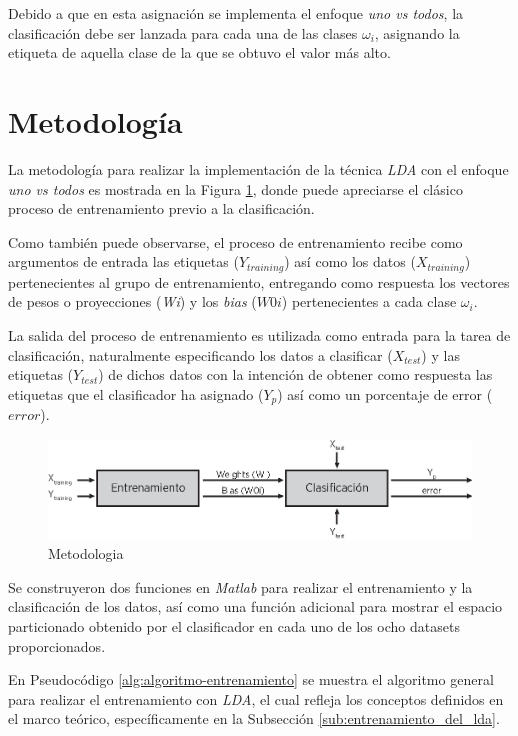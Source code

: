 \documentclass[journal]{IEEEtran}
\begin{document}
Debido a que en esta asignación se implementa el enfoque \emph{uno vs todos}, la clasificación debe ser lanzada para cada una de las clases $\omega_i$, asignando la etiqueta de aquella clase de la que se obtuvo el valor más alto.

\section{Metodología}
\label{sec:metodologia}
La metodología para realizar la implementación de la técnica \emph{LDA} con el enfoque \emph{uno vs todos} es mostrada en la Figura \ref{fig:metodologia}, donde puede apreciarse el clásico proceso de entrenamiento previo a la clasificación.

Como también puede observarse, el proceso de entrenamiento recibe como argumentos de entrada las etiquetas ($Y_{training}$) así como los datos ($X_{training}$) pertenecientes al grupo de entrenamiento, entregando como respuesta los vectores de pesos o proyecciones (\emph{Wi}) y los \emph{bias} ($W0i$) pertenecientes a cada clase $\omega_i$.

La salida del proceso de entrenamiento es utilizada como entrada para la tarea de clasificación, naturalmente especificando los datos a clasificar ($X_{test}$) y las etiquetas ($Y_{test}$) de dichos datos con la intención de obtener como respuesta las etiquetas que el clasificador ha asignado ($Y_p$) así como un porcentaje de error ($error$).

\begin{figure} [ht]
\centering 
\includegraphics[width=\columnwidth]{imagenes/metodologia}
\caption{Metodologia}
\label{fig:metodologia}
\end{figure}

Se construyeron dos funciones en \emph{Matlab} para realizar el entrenamiento y la clasificación de los datos, así como una función adicional para mostrar el espacio particionado obtenido por el clasificador en cada uno de los ocho datasets proporcionados.

En Pseudocódigo \ref{alg:algoritmo-entrenamiento} se muestra el algoritmo general para realizar el entrenamiento con \emph{LDA}, el cual refleja los conceptos definidos en el marco teórico, específicamente en la Subsección \ref{sub:entrenamiento_del_lda}.
\end{document}
